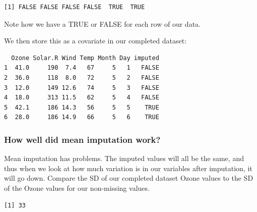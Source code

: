 \documentclass[
  letterpaper,
  DIV=11,
  numbers=noendperiod]{scrreprt}
\newenvironment{Shaded}{}{}
\newcommand{\AttributeTok}[1]{\textcolor[rgb]{0.49,0.56,0.16}{#1}}
\newcommand{\ConstantTok}[1]{\textcolor[rgb]{0.53,0.00,0.00}{#1}}
\newcommand{\FunctionTok}[1]{\textcolor[rgb]{0.02,0.16,0.49}{#1}}
\newcommand{\NormalTok}[1]{#1}
\newcommand{\OtherTok}[1]{\textcolor[rgb]{0.00,0.44,0.13}{#1}}
\newcommand{\SpecialCharTok}[1]{\textcolor[rgb]{0.25,0.44,0.63}{#1}}
\begin{document}
\begin{verbatim}
[1] FALSE FALSE FALSE FALSE  TRUE  TRUE
\end{verbatim}

Note how we have a TRUE or FALSE for each row of our data.

We then store this as a covariate in our completed dataset:

\begin{Shaded}
\end{Shaded}

\begin{verbatim}
  Ozone Solar.R Wind Temp Month Day imputed
1  41.0     190  7.4   67     5   1   FALSE
2  36.0     118  8.0   72     5   2   FALSE
3  12.0     149 12.6   74     5   3   FALSE
4  18.0     313 11.5   62     5   4   FALSE
5  42.1     186 14.3   56     5   5    TRUE
6  28.0     186 14.9   66     5   6    TRUE
\end{verbatim}

\subsubsection{How well did mean imputation
work?}\label{how-well-did-mean-imputation-work}

Mean imputation has problems. The imputed values will all be the same,
and thus when we look at how much variation is in our variables after
imputation, it will go down. Compare the SD of our completed dataset
Ozone values to the SD of the Ozone values for our non-missing values.

\begin{Shaded}
\end{Shaded}

\begin{verbatim}
[1] 33
\end{verbatim}

\begin{Shaded}
\end{Shaded}
\end{document}
